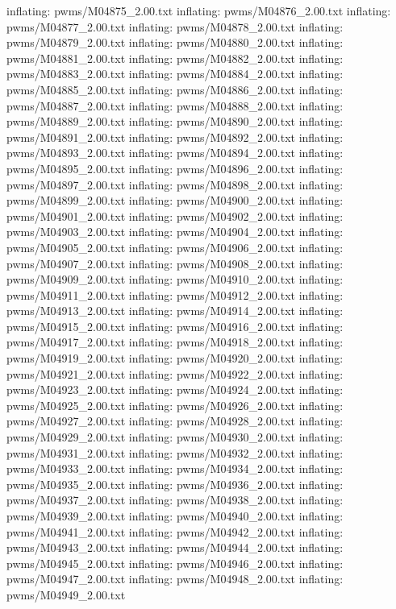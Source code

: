 \documentclass[letterpaper,10pt,english]{sphinxmanual}
\begin{document}
{\begin{sphinxVerbatim}[commandchars=\\\{\}]
  inflating: pwms/M04875\_2.00.txt
  inflating: pwms/M04876\_2.00.txt
  inflating: pwms/M04877\_2.00.txt
  inflating: pwms/M04878\_2.00.txt
  inflating: pwms/M04879\_2.00.txt
  inflating: pwms/M04880\_2.00.txt
  inflating: pwms/M04881\_2.00.txt
  inflating: pwms/M04882\_2.00.txt
  inflating: pwms/M04883\_2.00.txt
  inflating: pwms/M04884\_2.00.txt
  inflating: pwms/M04885\_2.00.txt
  inflating: pwms/M04886\_2.00.txt
  inflating: pwms/M04887\_2.00.txt
  inflating: pwms/M04888\_2.00.txt
  inflating: pwms/M04889\_2.00.txt
  inflating: pwms/M04890\_2.00.txt
  inflating: pwms/M04891\_2.00.txt
  inflating: pwms/M04892\_2.00.txt
  inflating: pwms/M04893\_2.00.txt
  inflating: pwms/M04894\_2.00.txt
  inflating: pwms/M04895\_2.00.txt
  inflating: pwms/M04896\_2.00.txt
  inflating: pwms/M04897\_2.00.txt
  inflating: pwms/M04898\_2.00.txt
  inflating: pwms/M04899\_2.00.txt
  inflating: pwms/M04900\_2.00.txt
  inflating: pwms/M04901\_2.00.txt
  inflating: pwms/M04902\_2.00.txt
  inflating: pwms/M04903\_2.00.txt
  inflating: pwms/M04904\_2.00.txt
  inflating: pwms/M04905\_2.00.txt
  inflating: pwms/M04906\_2.00.txt
  inflating: pwms/M04907\_2.00.txt
  inflating: pwms/M04908\_2.00.txt
  inflating: pwms/M04909\_2.00.txt
  inflating: pwms/M04910\_2.00.txt
  inflating: pwms/M04911\_2.00.txt
  inflating: pwms/M04912\_2.00.txt
  inflating: pwms/M04913\_2.00.txt
  inflating: pwms/M04914\_2.00.txt
  inflating: pwms/M04915\_2.00.txt
  inflating: pwms/M04916\_2.00.txt
  inflating: pwms/M04917\_2.00.txt
  inflating: pwms/M04918\_2.00.txt
  inflating: pwms/M04919\_2.00.txt
  inflating: pwms/M04920\_2.00.txt
  inflating: pwms/M04921\_2.00.txt
  inflating: pwms/M04922\_2.00.txt
  inflating: pwms/M04923\_2.00.txt
  inflating: pwms/M04924\_2.00.txt
  inflating: pwms/M04925\_2.00.txt
  inflating: pwms/M04926\_2.00.txt
  inflating: pwms/M04927\_2.00.txt
  inflating: pwms/M04928\_2.00.txt
  inflating: pwms/M04929\_2.00.txt
  inflating: pwms/M04930\_2.00.txt
  inflating: pwms/M04931\_2.00.txt
  inflating: pwms/M04932\_2.00.txt
  inflating: pwms/M04933\_2.00.txt
  inflating: pwms/M04934\_2.00.txt
  inflating: pwms/M04935\_2.00.txt
  inflating: pwms/M04936\_2.00.txt
  inflating: pwms/M04937\_2.00.txt
  inflating: pwms/M04938\_2.00.txt
  inflating: pwms/M04939\_2.00.txt
  inflating: pwms/M04940\_2.00.txt
  inflating: pwms/M04941\_2.00.txt
  inflating: pwms/M04942\_2.00.txt
  inflating: pwms/M04943\_2.00.txt
  inflating: pwms/M04944\_2.00.txt
  inflating: pwms/M04945\_2.00.txt
  inflating: pwms/M04946\_2.00.txt
  inflating: pwms/M04947\_2.00.txt
  inflating: pwms/M04948\_2.00.txt
  inflating: pwms/M04949\_2.00.txt

\end{sphinxVerbatim}}
\end{document}
